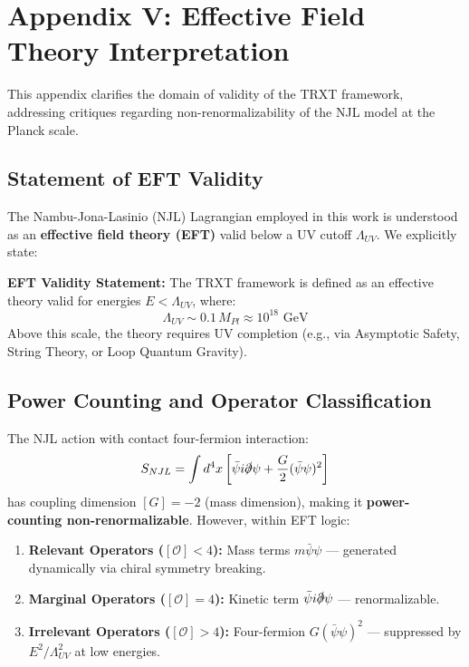 \section{Appendix V: Effective Field Theory Interpretation}

This appendix clarifies the domain of validity of the TRXT framework, addressing critiques regarding non-renormalizability of the NJL model at the Planck scale.

\subsection{Statement of EFT Validity}

The Nambu-Jona-Lasinio (NJL) Lagrangian employed in this work is understood as an \textbf{effective field theory (EFT)} valid below a UV cutoff $\Lambda_{UV}$. We explicitly state:

\begin{mdframed}[backgroundcolor=yellow!10]
\textbf{EFT Validity Statement:} The TRXT framework is defined as an effective theory valid for energies $E < \Lambda_{UV}$, where:
\begin{equation}
    \Lambda_{UV} \sim 0.1 \, M_{Pl} \approx 10^{18} \text{ GeV}
\end{equation}
Above this scale, the theory requires UV completion (e.g., via Asymptotic Safety, String Theory, or Loop Quantum Gravity).
\end{mdframed}

\subsection{Power Counting and Operator Classification}

The NJL action with contact four-fermion interaction:
\begin{equation}
    S_{NJL} = \int d^4x \left[ \bar{\psi} i \slashed{\partial} \psi + \frac{G}{2} (\bar{\psi}\psi)^2 \right]
\end{equation}
has coupling dimension $[G] = -2$ (mass dimension), making it \textbf{power-counting non-renormalizable}. However, within EFT logic:

\begin{enumerate}
    \item \textbf{Relevant Operators ($[\mathcal{O}] < 4$):} Mass terms $m\bar{\psi}\psi$ — generated dynamically via chiral symmetry breaking.
    \item \textbf{Marginal Operators ($[\mathcal{O}] = 4$):} Kinetic term $\bar{\psi} i \slashed{\partial} \psi$ — renormalizable.
    \item \textbf{Irrelevant Operators ($[\mathcal{O}] > 4$):} Four-fermion $G(\bar{\psi}\psi)^2$ — suppressed by $E^2/\Lambda_{UV}^2$ at low energies.
\end{enumerate}

